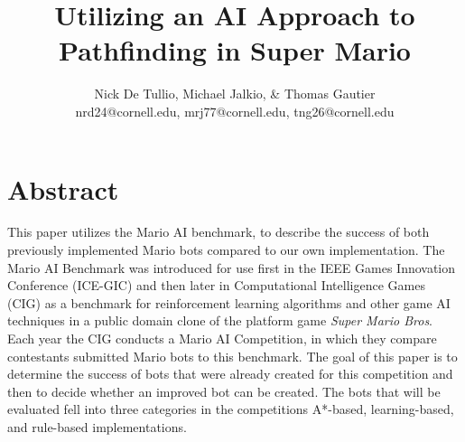 \documentclass[12pt]{article}
\begin{document}
\title{{\bf \large Utilizing an AI Approach to Pathfinding in Super Mario}\vspace{-2ex}}
\author{{\small Nick De Tullio, Michael Jalkio, \& Thomas Gautier}
\\ {\small nrd24@cornell.edu, mrj77@cornell.edu, tng26@cornell.edu}\vspace{-9ex}}
\date{}

\maketitle

\section * {Abstract}
This paper utilizes the Mario AI benchmark, to describe the success of both previously implemented Mario bots compared to our own implementation. The Mario AI Benchmark was introduced for use first in the IEEE Games Innovation Conference (ICE-GIC) and then later in Computational Intelligence Games (CIG) as a benchmark for reinforcement learning algorithms and other game AI techniques in a public domain clone of the platform game {\it Super Mario Bros}. Each year the CIG conducts a Mario AI Competition, in which they compare contestants submitted Mario bots to this benchmark. The goal of this paper is to determine the success of bots that were already created for this competition and then to decide whether an improved bot can be created. The bots that will be evaluated fell into three categories in the competitions A*-based, learning-based, and rule-based implementations.
\end{document}

